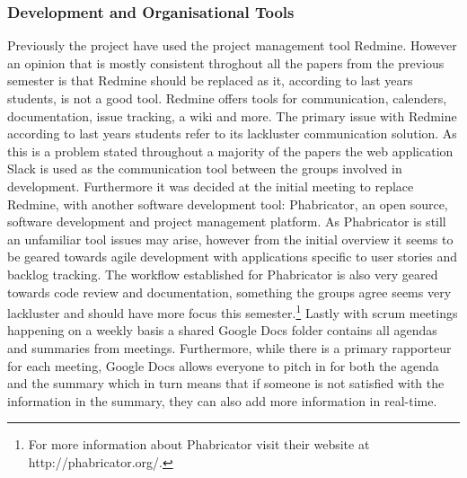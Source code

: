 \subsubsection*{Development and Organisational Tools}
Previously the project have used the project management tool Redmine.
However an opinion that is mostly consistent throghout all the papers from the previous semester is that Redmine should be replaced as it, according to last years students, is not a good tool.
Redmine offers tools for communication, calenders, documentation, issue tracking, a wiki and more.
The primary issue with Redmine according to last years students refer to its lackluster communication solution.
As this is a problem stated throughout a majority of the papers the web application Slack is used as the communication tool between the groups involved in development.
Furthermore it was decided at the initial meeting to replace Redmine, with another software development tool: Phabricator, an open source, software development and project management platform. 
As Phabricator is still an unfamiliar tool issues may arise, however from the initial overview it seems to be geared towards agile development with applications specific to user stories and backlog tracking.
The workflow established for Phabricator is also very geared towards code review and documentation, something the groups agree seems very lackluster and should have more focus this semester.\footnote{For more information about Phabricator visit their website at http://phabricator.org/.}
Lastly with scrum meetings happening on a weekly basis a shared Google Docs folder contains all agendas and summaries from meetings.
Furthermore, while there is a primary rapporteur for each meeting, Google Docs allows everyone to pitch in for both the agenda and the summary which in turn means that if someone is not satisfied with the information in the summary, they can also add more information in real-time.
